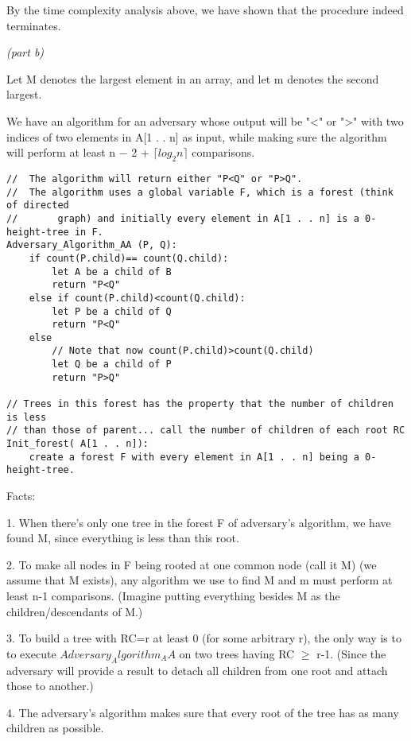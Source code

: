 \documentclass[a4paper, 10pt]{article}
\begin{document}
{\begin{addmargin}[15pt]{0in}
{By the time complexity analysis above, we have shown that the procedure indeed terminates.
}
\end{addmargin}
{\noindent\large\it(part b)}

Let M denotes the largest element in an array, and let m denotes the second largest.

We have an algorithm for an adversary whose output will be "<" or ">" with two indices of two elements in A[1 . . n] as input, while making sure the algorithm will perform at least n − 2 + $\lceil log_2 n\rceil$ comparisons.

\begin{lstlisting}
//  The algorithm will return either "P<Q" or "P>Q".
//  The algorithm uses a global variable F, which is a forest (think of directed
//       graph) and initially every element in A[1 . . n] is a 0-height-tree in F.
Adversary_Algorithm_AA (P, Q):
    if count(P.child)== count(Q.child):
        let A be a child of B
        return "P<Q"
    else if count(P.child)<count(Q.child):
        let P be a child of Q
        return "P<Q"
    else 
        // Note that now count(P.child)>count(Q.child)
        let Q be a child of P
        return "P>Q"

// Trees in this forest has the property that the number of children is less 
// than those of parent... call the number of children of each root RC
Init_forest( A[1 . . n]):
    create a forest F with every element in A[1 . . n] being a 0-height-tree.
\end{lstlisting}
Facts:

1. When there's only one tree in the forest F of adversary's algorithm, we have found M, since everything is less than this root.

2. To make all nodes in F being rooted at one common node (call it M) (we assume that M exists), any algorithm we use to find M and m must perform at least n-1 comparisons. (Imagine putting everything besides M as the children/descendants of M.)

3. To build a tree with RC=r at least 0 (for some arbitrary r), the only way is to to execute $Adversary_Algorithm_AA$ on two trees having RC $\ge$ r-1. (Since the adversary will provide a result to detach all children from one root and attach those to another.) 

4. The adversary's algorithm makes sure that every root of the tree has as many children as possible.

}
\end{document}
